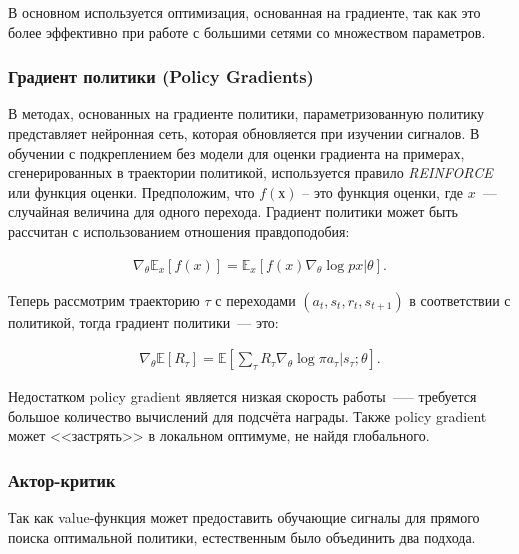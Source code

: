 В основном используется оптимизация, основанная на градиенте, так как это более эффективно при работе с большими сетями со множеством параметров. \cite{Arulkumaran_2017}

\subsubsection{Градиент политики (Policy Gradients)}

В методах, основанных на градиенте политики, параметризованную политику представляет нейронная сеть, которая обновляется при изучении сигналов. В обучении с подкреплением без модели для оценки градиента на примерах, сгенерированных в траектории политикой, используется правило {\itshape REINFORCE} или функция оценки. Предположим, что $f(х)$ – это функция оценки, где $x$~--- случайная величина для одного перехода. Градиент политики может быть рассчитан с использованием отношения правдоподобия:

\begin{equation}
    \label{eq:ch1-likelihood-ratios}
    \begin{multlined}
        \nabla_\theta \mathbb{E}_x[f(x)] = \mathbb{E}_x[f(x) \nabla_\theta \log p x|\theta].
    \end{multlined}
\end{equation}

Теперь рассмотрим траекторию $\tau$ с переходами $(a_t, s_t, r_t, s_{t+1})$ в соответствии с политикой, тогда градиент политики~--- это:

\begin{equation}
    \label{eq:ch1-likelihood-ratios}
    \begin{multlined}
        \nabla_\theta \mathbb{E}[R_\tau] = \mathbb{E}[\sum_\tau R_\tau \nabla_\theta \log \pi {a_\tau|s_\tau;\theta}].
    \end{multlined}
\end{equation}

Недостатком policy gradient является низкая скорость работы~—-- требуется большое количество вычислений для подсчёта награды. Также policy gradient может <<застрять>> в локальном оптимуме, не найдя глобального.

\subsubsection{Актор-критик}

Так как value-функция может предоставить обучающие сигналы для прямого поиска оптимальной политики, естественным было объединить два подхода.

